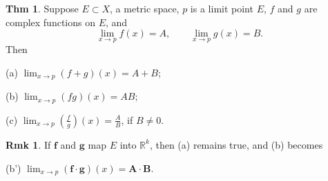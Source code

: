\documentclass{article}
\theoremstyle{definition}
\newtheorem{theorem}[definition]{Thm}
\newtheorem{remarks}[definition]{Rmk}
\begin{document}
\begin{theorem}
    Suppose $E\subset X$, a metric space, $p$ is a limit point $E$, $f$ and $g$ are complex functions on $E$, and
    \[
    \lim_{x\to p} f(x)=A,\qquad \lim_{x\to p}g(x)=B.
    \]
    Then\par
    (a) $\lim_{x\to p}(f+g)(x)=A+B$;\par
    (b) $\lim_{x\to p}(fg)(x)=AB$;\par
    (c) $\lim_{x\to p}(\frac{f}{g})(x)=\frac{A}{B}$, if $B\neq0$.
\end{theorem}
\begin{remarks}
    If $\mathbf{f}$ and $\mathbf{g}$ map $E$ into $\mathbb{R}^k$, then (a) remains true, and (b) becomes\par
    (b') $\lim_{x\to p} (\mathbf{f}\cdot\mathbf{g})(x)=\mathbf{A}\cdot\mathbf{B}$.
\end{remarks}
\end{document}
